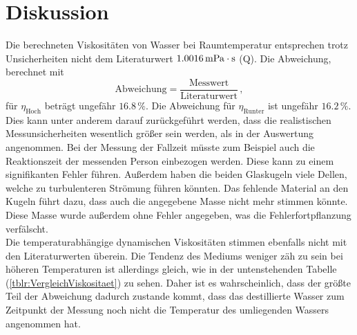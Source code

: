 \section{Diskussion}
\label{sec:Diskussion}
Die berechneten Viskositäten von Wasser bei Raumtemperatur entsprechen trotz Unsicherheiten nicht
dem Literaturwert $1.0016 \,\unit[inter-unit-product=\cdot]{\milli\pascal\second}$ (Q\cite{wasserVisk}). Die Abweichung, berechnet mit 
\begin{equation}
  \text{Abweichung}= \frac{\text{Messwert}}{\text{Literaturwert}}\, , 
\end{equation}
 für $\eta_{\text{Hoch}}$ 
beträgt ungefähr $16.8 \,\%$. Die Abweichung für $\eta_{\text{Runter}}$ ist ungefähr $16.2 \,\%$. \\ 
Dies kann unter anderem darauf zurückgeführt werden, 
dass die realistischen Messunsicherheiten wesentlich größer sein werden, als in der Auswertung angenommen. Bei der Messung der Fallzeit müsste zum Beispiel auch die 
Reaktionszeit der messenden Person einbezogen werden. Diese kann zu einem signifikanten Fehler führen. Außerdem haben die beiden Glaskugeln viele Dellen, welche 
zu turbulenteren Strömung führen könnten. Das fehlende Material an den Kugeln führt dazu, dass auch die angegebene Masse nicht mehr stimmen könnte. Diese Masse wurde 
außerdem ohne Fehler angegeben, was die Fehlerfortpflanzung verfälscht. 
\\
Die temperaturabhängige dynamischen Viskositäten stimmen ebenfalls nicht mit den Literaturwerten überein. Die Tendenz des Mediums weniger zäh 
zu sein bei höheren Temperaturen ist allerdings gleich, wie in der untenstehenden Tabelle (\ref{tblr:VergleichViskositaet}) zu sehen. Daher ist es wahrscheinlich, dass der größte Teil der Abweichung dadurch zustande kommt, 
dass das destillierte Wasser zum Zeitpunkt der Messung noch nicht die Temperatur des umliegenden Wassers angenommen hat. \\
